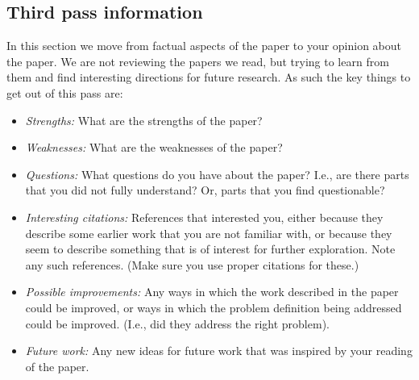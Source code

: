 \documentclass[letterpaper,twocolumn,10pt]{article}
\begin{document}
\subsection{Third pass information}
\label{sec:third}

In this section we move from factual aspects of the paper to
your opinion about the paper.
We are not reviewing the papers we read, but trying
to learn from them and find interesting directions
for future research. As such the key things to get out
of this pass are:

\begin{itemize}

\item {\it Strengths:} What are the strengths of the paper? 

\item {\it Weaknesses:} What are the weaknesses of the paper? 

\item {\it Questions:} What questions do you have about the paper? I.e., are there
parts that you did not fully understand? Or, parts that you find
questionable?

\item {\it Interesting citations:} References that interested you, either because
they describe some earlier work that you are not familiar with,
or because they seem to describe something that is of interest
for further exploration. Note any such references. (Make sure you
use proper citations for these.)

\item {\it Possible improvements:} Any ways in which the work described in
the paper could be
improved, or ways in which the problem definition being addressed
could be improved. (I.e., did they address the right problem).

\item {\it Future work:} Any new ideas for future work that was inspired by
your reading of the paper.

\end{itemize}

{
  \small 
  
  
}
\end{document}
